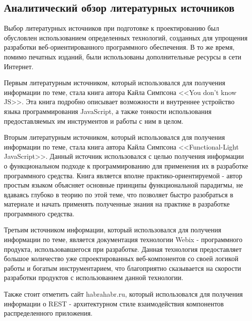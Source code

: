 \subsection{Аналитический обзор литературных источников}
\label{sec:analysis:literature}

Выбор литературных источников при подготовке к проектированию был обусловлен использованием определенных технологий, созданных для упрощения разработки веб-ориентированного программного обеспечения. В то же время, помимо печатных изданий, были использованы дополнительные ресурсы в сети Интернет.

Первым литературным источником, который использовался для получения информации по теме, стала книга автора Кайла Симпсона <<You don’t know JS>>. Эта книга подробно описывает возможности и внутреннее устройство языка программирования JavaScript, а также тонкости использования предоставляемых им инструментов и работы с ним в целом. 

Вторым литературным источником, который использовался для получения информации по теме, стала книга автора Кайла Симпсона <<Functional-Light JavaScript>>. Данный источник использовался с целью получения информации о функциональном подходе к программированию для применения их в разработке программного средства. Книга является вполне практико-ориентируемой - автор простым языком объясняет основные принципы функциональной парадигмы, не вдаваясь глубоко в теорию по этой теме, что позволяет быстро разобраться в материале и начать применять полученные знания на практике в разработке программного средства.

Третьим источником информации, который использовался для получения информации по теме, является документация технологии Webix - программного продукта, использовавшегося при разработке. Данная технология предоставляет большое количество уже спроектированных веб-компонентов со своей логикой работы и богатым инструментарием, что благоприятно сказывается на скорости разработки продуктов с использованием данной технологии.

Также стоит отметить сайт habrahabr.ru, который использовался для получения информации о REST - архитектурном стиле взаимодействия компонентов распределенного приложения.